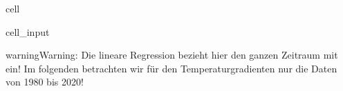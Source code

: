 \documentclass[letterpaper,10pt,english]{jupyterBook}
\begin{document}
\begin{sphinxuseclass}{cell}\begin{sphinxVerbatimInput}

\begin{sphinxuseclass}{cell_input}
\begin{sphinxVerbatim}[commandchars=\\\{\}]
\PYG{p}{[}\PYG{p}{]}\PYG{p}{[}\PYG{p}{]}
\PYG{p}{[}\PYG{p}{]}\PYG{p}{[}\PYG{p}{]}
\end{sphinxVerbatim}

\end{sphinxuseclass}\end{sphinxVerbatimInput}

\end{sphinxuseclass}
\begin{sphinxadmonition}{warning}{Warning:}
\sphinxAtStartPar
Die lineare Regression bezieht hier den ganzen Zeitraum mit ein! Im folgenden betrachten wir für den Temperaturgradienten nur die Daten von 1980 bis 2020!
\end{sphinxadmonition}
\end{document}
